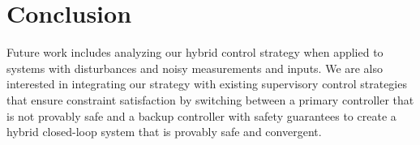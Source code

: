 
\section{Conclusion}
Future work includes analyzing our hybrid control 
strategy when applied to systems with disturbances 
and noisy measurements and inputs.
We are also interested in integrating our strategy
with existing supervisory control strategies that ensure
constraint satisfaction by switching between 
a primary controller that is not provably safe 
and a backup controller with safety guarantees
to create a hybrid closed-loop system 
that is provably safe and convergent.

